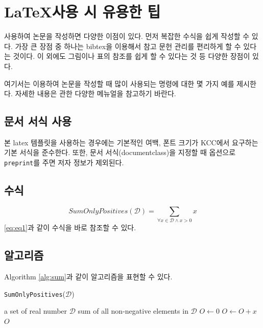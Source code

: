 \documentclass{kcc}
\begin{document}
\section{\LaTeX 사용 시 유용한 팁}

 사용하여 논문을 작성하면 다양한 이점이 있다.
먼저 복잡한 수식을 쉽게 작성할 수 있다.
가장 큰 장점 중 하나는 bibtex을 이용해서 참고 문헌 관리를 편리하게 할 수 있다는 것이다.
이 외에도 그림이나 표의 참조를 쉽게 할 수 있다는 것 등 다양한 장점이 있다.

여기서는  이용하여 논문을 작성할 때 많이 사용되는 명령에 대한 몇 가지 예를 제시한다.
자세한 내용은  관한 다양한 메뉴얼을 참고하기 바란다.

\subsection{문서 서식 사용}
본 latex 템플릿을 사용하는 경우에는 기본적인 여백, 폰트 크기가 KCC에서 요구하는 기본 서식을 준수한다.
또한, 문서 서식(documentclass)을 지정할 때 옵션으로 {\tt preprint}를 주면 저자 정보가 제외된다.


\subsection{수식}
\begin{equation}
\label{eq:eq1}
SumOnlyPositives(\mathcal{D}) = \sum_{\forall x \in \mathcal{D} \land x > 0 }x
\end{equation}
\eqref{eq:eq1}과 같이 수식을 바로 참조할 수 있다.


\subsection{알고리즘}
Algorithm \ref{alg:sum}과 같이 알고리즘을 표현할 수 있다.
\begin{algorithm}[!ht]
\label{alg:sum}
\caption[Short label]{\texttt{SumOnlyPositives}($\mathcal{D}$)}
\begin{algorithmic}[1]
\REQUIRE a set of real number $\mathcal{D}$ 
\ENSURE sum of all non-negative elements in $\mathcal{D}$ 
\STATE $O \leftarrow 0$
		\STATE $O \leftarrow O + x$
	\ENDIF
\ENDFOR
\RETURN $O$
\end{algorithmic}
\end{algorithm}

  
\end{document}
